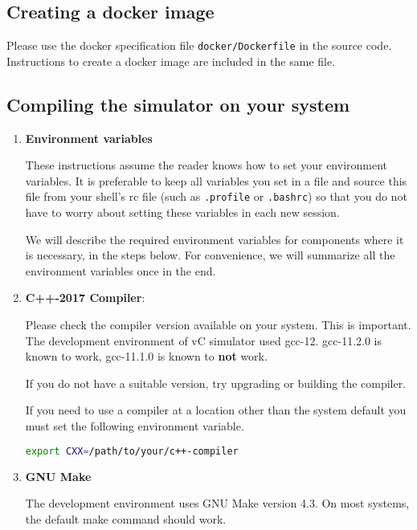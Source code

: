 \documentclass[12pt,a4paper]{article}
\begin{document}
\subsection{Creating a docker image}

Please use the docker specification file \texttt{docker/Dockerfile} in the source code. Instructions to create a docker image are included in the same file.


\subsection{Compiling the simulator on your system}

\begin{enumerate}

\item \textbf{Environment variables}

These instructions assume the reader knows how to set your environment variables. It is preferable to keep all variables you set in a file and source this file from your shell's rc file (such as \texttt{.profile} or \texttt{.bashrc}) so that you do not have to worry about setting these variables in each new session.

We will describe the required environment variables for components where it is necessary, in the steps below. For convenience, we will summarize all the environment variables once in the end.

\item \textbf{C++-2017 Compiler}:

Please check the compiler version available on your system. This is important. The development environment of vC simulator used gcc-12. gcc-11.2.0 is known to work, gcc-11.1.0 is known to \textbf{not} work.

If you do not have a suitable version, try upgrading or building the compiler.

If you need to use a compiler at a location other than the system default you must set the following environment variable.

\begin{lstlisting}[language=bash,style=snippet]
export CXX=/path/to/your/c++-compiler
\end{lstlisting}

\item \textbf{GNU Make}

The development environment uses GNU Make version 4.3. On most systems, the default make command should work.


\end{enumerate}
\end{document}
